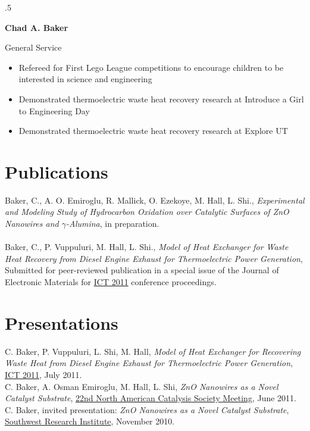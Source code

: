 \documentclass[centered]{res}
\begin{document}
\begin{resume}
\newpage{}
\moveleft.5\hoffset\centerline{\large\bf Chad A. Baker}
General Service
\begin{itemize} \itemsep -2pt %
\item Refereed for First Lego League competitions to encourage
  children to be interested in science and engineering
\item Demonstrated thermoelectric waste heat recovery research at
  Introduce a Girl to Engineering Day
\item Demonstrated thermoelectric waste heat recovery research at
  Explore UT 
\end{itemize}

\section{Publications}

Baker, C., A. O. Emiroglu, R. Mallick, O. Ezekoye, M. Hall, L. Shi.,
\textit{Experimental and Modeling Study of Hydrocarbon Oxidation over
  Catalytic Surfaces of ZnO Nanowires and $\gamma$-Alumina}, in
preparation. \\
\vspace{-5pt} \\
%
Baker, C., P. Vuppuluri, M. Hall, L. Shi., \textit{Model of Heat
  Exchanger for Waste Heat Recovery from Diesel Engine Exhaust for
  Thermoelectric Power Generation}, Submitted for peer-reviewed
publication in a special issue of the Journal of Electronic Materials
for \href{http://ict2011.its.org/}{ICT 2011} conference proceedings.

\section{Presentations}

C. Baker, P. Vuppuluri, L. Shi, M. Hall, \textit{Model of Heat
  Exchanger for Recovering Waste Heat from Diesel Engine Exhaust for
  Thermoelectric Power Generation},
\href{http://ict2011.its.org/}{ICT 2011}, July 2011. 
\vspace{5pt} \\
C. Baker, A. Osman Emiroglu, M. Hall, L. Shi, \textit{ZnO
  Nanowires as a Novel Catalyst Substrate},
\href{http://www.22nam.org/}{22nd North
  American Catalysis Society Meeting}, June 2011. 
\vspace{5pt} \\
C. Baker, invited presentation: \textit{ZnO Nanowires as
  a Novel Catalyst Substrate},
\href{http://www.swri.org/4org/d03/d03home.htm}%
{Southwest Research Institute}, November 2010.


\end{resume}
\end{document}
